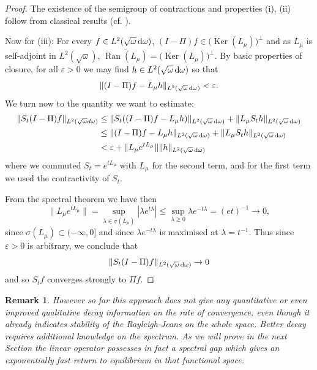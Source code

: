 \documentclass[reqno,11pt,letterpaper]{amsart}
\numberwithin{equation}{section}
\newcommand{\dd}{\, {\rm d}}
\newtheorem{remark}{Remark}
\begin{document}
\begin{proof}
The existence of the semigroup of contractions and properties (i), (ii) follow from classical results (cf. \cite {brezis2011}).

Now for (iii): For every $f\in L^2(\sqrt{\omega}\dd\omega)$,  
$(I-\Pi)f \in \big( \operatorname{Ker}(L_\mu ) \big)^\perp$ and as $L_\mu$ is self-adjoint in $L^2(\sqrt{\omega})$, $\overline{\operatorname{Ran}(L_\mu )} =\big( \operatorname{Ker}(L_\mu) \big)^\perp$. By basic properties of closure, for all $\varepsilon>0$ we may find $h \in L^2(\sqrt{\omega}\dd \omega)$ so that $$ \| (I-\Pi)f - L_\mu h\|_{L^2(\sqrt{\omega}\dd \omega)} < \varepsilon. $$
We turn now to the quantity we want to estimate:
\begin{equation}
    \begin{split}
        \|S_t (I- \Pi)f\|_{L^2(\sqrt{\omega}d \omega)} & \leq \|S_t ( (I- \Pi)f - L_\mu h) \|_{L^2(\sqrt{\omega}\dd \omega)} + \| L_\mu S_t  h\|_{L^2(\sqrt{\omega}\dd \omega)}\\
        & \leq \| (I- \Pi)f - L_\mu h \|_{L^2(\sqrt{\omega}\dd \omega)} + \| L_\mu S_t  h\|_{L^2(\sqrt{\omega}\dd \omega)}
        \\ & < 
        \varepsilon + \| L_\mu e^{t L_\mu}\| \|h\|_{L^2(\sqrt{\omega}\dd  \omega)}
    \end{split}
\end{equation}
where we commuted $S_t=e^{t L_\mu}$ with $L_\mu$ for the second term, and for the first term we used the  contractivity of $S_t$.

From the spectral theorem we have then 
$$\| L_\mu e^{tL_\mu} \| = \sup_{\lambda \in \sigma(L_\mu)} |\lambda e^{t \lambda}| \leq \sup_{\lambda \geq 0} \lambda e^{-t \lambda} = (et)^{-1} \to  0, $$
since $\sigma(L_\mu) \subset (-\infty, 0]$ and since $\lambda e^{-t \lambda}$ is maximised at $\lambda=t^{-1}$. Thus since $\varepsilon > 0$ is arbitrary, we conclude that 
$$\|S_t (I- \Pi)f\|_{L^2(\sqrt{\omega}\dd \omega)}  \to 0 $$
and so $S_t f$ converges strongly to $\Pi f$. 
\end{proof}

\begin{remark}However so far this approach does not give any quantitative or even improved qualitative decay information on the rate of convergence, even though it already indicates stability of the Rayleigh-Jeans on the whole space.
Better decay requires additional knowledge on the spectrum. As we will prove in the next Section the linear operator possesses in fact a spectral gap which gives an exponentially fast return to equilibrium in that functional space. 
\end{remark}
\end{document}
